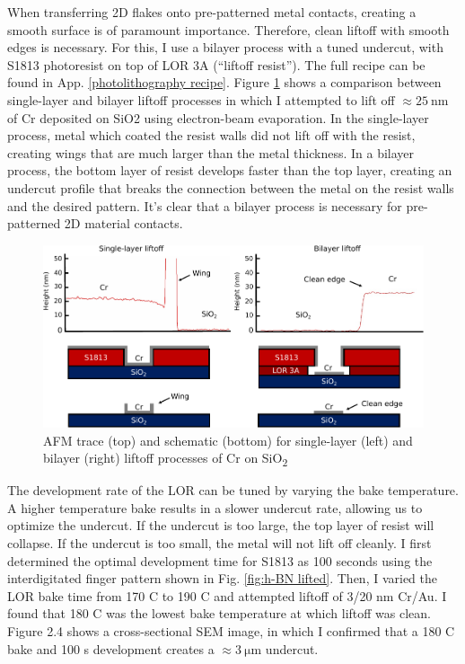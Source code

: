 \documentclass[double,12pt,1in]{beavtex}
\begin{document}
When transferring 2D flakes onto pre-patterned metal contacts, creating a smooth surface is of paramount importance. Therefore, clean liftoff with smooth edges is necessary. For this, I use a bilayer process with a tuned undercut, with S1813 photoresist on top of LOR 3A (“liftoff resist”). The full recipe can be found in App. \ref{photolithography recipe}. Figure \ref{fig:Liftoff AFM} shows a comparison between single-layer and bilayer liftoff processes in which I attempted to lift off $\approx \SI{25}{\nano\meter}$ of Cr deposited on SiO2 using electron-beam evaporation. In the single-layer process, metal which coated the resist walls did not lift off with the resist, creating wings that are much larger than the metal thickness. In a bilayer process, the bottom layer of resist develops faster than the top layer, creating an undercut profile that breaks the connection between the metal on the resist walls and the desired pattern. It’s clear that a bilayer process is necessary for pre-patterned 2D material contacts. 


\begin{figure}
    \includegraphics[width = 1\textwidth]{liftoff AFM traces comparison.pdf}
    \caption{AFM trace (top) and schematic (bottom) for single-layer (left) and bilayer (right) liftoff processes of Cr on SiO\textsubscript{2}}
    \label{fig:Liftoff AFM}
\end{figure}

The development rate of the LOR can be tuned by varying the bake temperature. A higher temperature bake results in a slower undercut rate, allowing us to optimize the undercut. If the undercut is too large, the top layer of resist will collapse. If the undercut is too small, the metal will not lift off cleanly. I first determined the optimal development time for S1813 as 100 seconds using the interdigitated finger pattern shown in Fig. \ref{fig:h-BN lifted}. Then, I varied the LOR bake time from 170 C to 190 C and attempted liftoff of 3/20 nm Cr/Au. I found that 180 C was the lowest bake temperature at which liftoff was clean. Figure 2.4 shows a cross-sectional SEM image, in which I confirmed that a 180 C bake and 100 s development creates a $\approx \SI{3}{\micro\meter}$ undercut.
\end{document}
